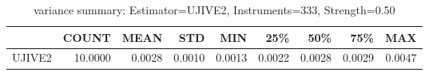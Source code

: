 \begin{table}[ht]
\centering
\caption{variance summary: Estimator=UJIVE2, Instruments=333, Strength=0.50}
\begin{tabular}{lrrrrrrrr}
\toprule
 & COUNT & MEAN & STD & MIN & 25\% & 50\% & 75\% & MAX \\
\midrule
UJIVE2 & 10.0000 & 0.0028 & 0.0010 & 0.0013 & 0.0022 & 0.0028 & 0.0029 & 0.0047 \\
\bottomrule
\end{tabular}
\end{table}
